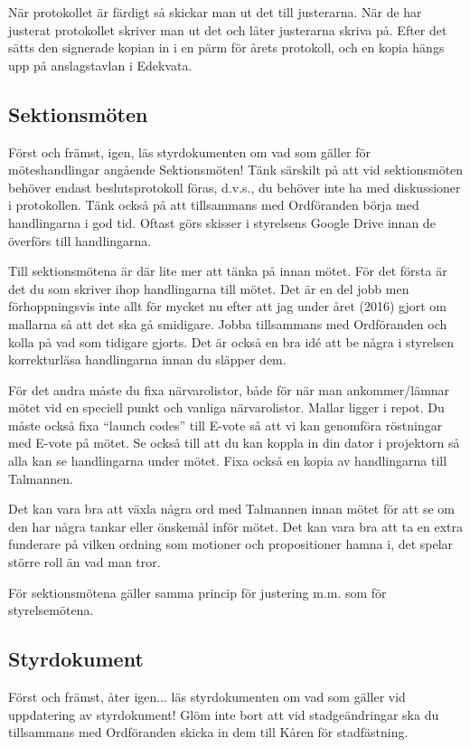 \documentclass[10pt]{article}
\begin{document}
När protokollet är färdigt så skickar man ut det till justerarna. När de har justerat protokollet skriver man ut det och låter justerarna skriva på. Efter det sätts den signerade kopian in i en pärm för årets protokoll, och en kopia hängs upp på anslagstavlan i Edekvata.

\subsection{Sektionsmöten}
Först och främst, igen, läs styrdokumenten om vad som gäller för möteshandlingar angående Sektionsmöten! Tänk särskilt på att vid sektionsmöten behöver endast beslutsprotokoll föras, d.v.s., du behöver inte ha med diskussioner i protokollen. Tänk också på att tillsammans med Ordföranden börja med handlingarna i god tid. Oftast görs skisser i styrelsens Google Drive innan de överförs till handlingarna.

Till sektionsmötena är där lite mer att tänka på innan mötet. För det första är det du som skriver ihop handlingarna till mötet. Det är en del jobb men förhoppningsvis inte allt för mycket nu efter att jag under året (2016) gjort om mallarna så att det ska gå smidigare. Jobba tillsammans med Ordföranden och kolla på vad som tidigare gjorts. Det är också en bra idé att be några i styrelsen korrekturläsa handlingarna innan du släpper dem.

För det andra måste du fixa närvarolistor, både för när man ankommer/lämnar mötet vid en speciell punkt och vanliga närvarolistor. Mallar ligger i repot. Du måste också fixa ``launch codes'' till E-vote så att vi kan genomföra röstningar med E-vote på mötet. Se också till att du kan koppla in din dator i projektorn så alla kan se handlingarna under mötet. Fixa också en kopia av handlingarna till Talmannen.

Det kan vara bra att växla några ord med Talmannen innan mötet för att se om den har några tankar eller önskemål inför mötet. Det kan vara bra att ta en extra funderare på vilken ordning som motioner och propositioner hamna i, det spelar större roll än vad man tror.

För sektionsmötena gäller samma princip för justering m.m. som för styrelsemötena.
\newpage
\subsection{Styrdokument}
Först och främst, åter igen... läs styrdokumenten om vad som gäller vid uppdatering av styrdokument! Glöm inte bort att vid stadgeändringar ska du tillsammans med Ordföranden skicka in dem till Kåren för stadfästning.
\end{document}
